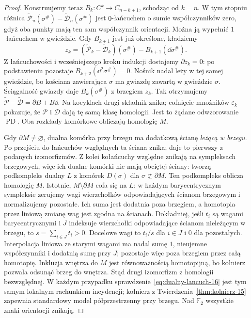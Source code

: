 \begin{proof}
Konstruujemy teraz $B_k:C^k\to C_{n-k+1}$,
schodząc od $k=n$. W tym stopniu różnica
$\widetilde{\mathcal P}_n(\sigma^\#)
-\widetilde{\mathcal D}_n(\sigma^\#)$ jest $0$-łańcuchem
o sumie współczynników zero, gdyż oba punkty mają
ten sam współczynnik orientacji.
Można ją wypełnić $1$-łańcuchem w gwieździe.
Gdy $B_{k+1}$ jest już określone, kładziemy
\[
 z_k=(\widetilde{\mathcal P}_k-\widetilde{\mathcal D}_k)(\sigma^\#)
                  -B_{k+1}(\dd\sigma^\#).
\]
Z łańcuchowości i wcześniejszego kroku indukcji dostajemy
$\partial z_k=0$: po podstawieniu pozostaje
$B_{k+2}(\dd^2\sigma^\#)=0$.
Nośnik nadal leży w tej samej gwieździe,
bo kościana zawierająca $\sigma$ ma gwiazdę zawartą
w gwieździe $\sigma$.
Ściągalność gwiazdy daje $B_k(\sigma^\#)$
z brzegiem $z_k$.
Tak otrzymujemy
$\widetilde{\mathcal P}-\widetilde{\mathcal D}
=\partial B+B\dd$.
Na kocyklach drugi składnik znika; cofnięcie
mnożników $\varepsilon_k$ pokazuje, że $\mathcal P$
i $\mathcal D$ dają tę samą klasę homologii.
Jest to żądane odwzorowanie $\operatorname{PD}$.
Oba rozkłady komórkowe obliczają homologię $M$.

Gdy $\partial M\ne\varnothing$,
dualna komórka przy brzegu
ma dodatkową ścianę
\emph{leżącą w brzegu}.
Po przejściu do łańcuchów
względnych ta ściana znika;
daje to pierwszy z podanych
izomorfizmów. Z kolei
kołańcuchy względne znikają
na sympleksach brzegowych,
więc ich dualne komórki
nie mają obciętej ściany:
tworzą podkompleks dualny $L$ z komórek
$D(\sigma)$ dla $\sigma\not\subset\partial M$.
Ten podkompleks oblicza homologię $M$.
Istotnie, $M\setminus\partial M$ cofa się na $L$:
w każdym barycentrycznym sympleksie zerujemy wagi
wierzchołków odpowiadających ścianom brzegowym
i normalizujemy pozostałe. Ich suma jest dodatnia
poza brzegiem, a homotopia przez liniową zmianę wag
jest zgodna na ścianach.
Dokładniej, jeśli $t_i$ są wagami barycentrycznymi
i $J$ indeksuje wierzchołki odpowiadające ścianom
nieleżącym w brzegu, to $s=\sum_{i\in J}t_i>0$.
Docelowe wagi to $t_i/s$ dla $i\in J$ i $0$ dla pozostałych.
Interpolacja liniowa ze starymi wagami ma nadal sumę $1$,
nieujemne współczynniki i dodatnią sumę przy $J$;
pozostaje więc poza brzegiem przez całą homotopię.
Inkluzja wnętrza do $M$
jest równoważnością homotopijną, bo kołnierz pozwala
odsunąć brzeg do wnętrza. Stąd drugi izomorfizm
z homologii bezwzględnej.
W każdym przypadku
sprawdzenie~\eqref{eq:dualny-lancuch-16}
jest tym samym lokalnym
rachunkiem incydencji;
kołnierz z
Twierdzenia~\ref{thm:kolnierz-15}
zapewnia standardowy model
półprzestrzenny przy brzegu.
Nad $\mathbb F_2$ wszystkie
znaki orientacji znikają.
\end{proof}

